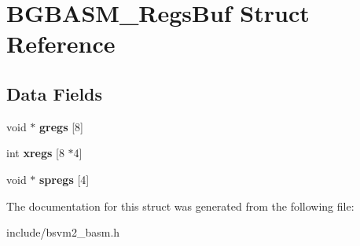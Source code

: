 \hypertarget{structBGBASM__RegsBuf}{\section{B\-G\-B\-A\-S\-M\-\_\-\-Regs\-Buf Struct Reference}
\label{structBGBASM__RegsBuf}
}
\subsection*{Data Fields}
\begin{DoxyCompactItemize}
\item 
\hypertarget{structBGBASM__RegsBuf_a639c4ea1b499cc48f88e24fb0e39112e}{void $\ast$ {\bfseries gregs} \mbox{[}8\mbox{]}}\label{structBGBASM__RegsBuf_a639c4ea1b499cc48f88e24fb0e39112e}

\item 
\hypertarget{structBGBASM__RegsBuf_ad6c254a560693c726ec88c7b738ebbc3}{int {\bfseries xregs} \mbox{[}8 $\ast$4\mbox{]}}\label{structBGBASM__RegsBuf_ad6c254a560693c726ec88c7b738ebbc3}

\item 
\hypertarget{structBGBASM__RegsBuf_a86913e6d2674cdf8a7e4e336f13365c4}{void $\ast$ {\bfseries spregs} \mbox{[}4\mbox{]}}\label{structBGBASM__RegsBuf_a86913e6d2674cdf8a7e4e336f13365c4}

\end{DoxyCompactItemize}


The documentation for this struct was generated from the following file\-:\begin{DoxyCompactItemize}
\item 
include/bsvm2\-\_\-basm.\-h\end{DoxyCompactItemize}
